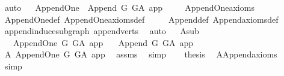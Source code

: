 \begin{isabellebody}
\ auto\isanewline
{}\isamarkupfalse%
%
\endisatagproof
{\isafoldproof}%
%
\isadelimproof
\ \isanewline
%
\endisadelimproof
\isanewline
\isanewline
{}\isamarkupfalse%
\ Append{\isacharunderscore}{\kern0pt}One\ {\isasymsubseteq}\ Append\ G\ G{\isacharunderscore}{\kern0pt}A\ {\isachardoublequoteopen}{\isacharbraceleft}{\kern0pt}app{\isacharbraceright}{\kern0pt}{\isachardoublequoteclose}\ \isanewline
%
\isadelimproof
\ \ %
\endisadelimproof
%
\isatagproof
{}\isamarkupfalse%
\ Append{\isacharunderscore}{\kern0pt}One{\isacharunderscore}{\kern0pt}axioms\ \ \isanewline
\ \ \isamarkupfalse%
\ Append{\isacharunderscore}{\kern0pt}One{\isacharunderscore}{\kern0pt}def\ Append{\isacharunderscore}{\kern0pt}One{\isacharunderscore}{\kern0pt}axioms{\isacharunderscore}{\kern0pt}def\ \isanewline
\ \ \ \ Append{\isacharunderscore}{\kern0pt}def\ Append{\isacharunderscore}{\kern0pt}axioms{\isacharunderscore}{\kern0pt}def\isanewline
\ \ \isamarkupfalse%
\ append{\isacharunderscore}{\kern0pt}induce{\isacharunderscore}{\kern0pt}subgraph\ append{\isacharunderscore}{\kern0pt}verts\ \isamarkupfalse%
\ auto%
\endisatagproof
{\isafoldproof}%
%
\isadelimproof
\ \isanewline
%
\endisadelimproof
\isanewline
{}\isamarkupfalse%
\ A{}{\isacharunderscore}{\kern0pt}sub{\isacharcolon}{\kern0pt}\isanewline
\ \ \ {\isachardoublequoteopen}Append{\isacharunderscore}{\kern0pt}One\ G\ G{\isacharunderscore}{\kern0pt}A\ app{\isachardoublequoteclose}\isanewline
\ \ \ {\isachardoublequoteopen}Append\ G\ G{\isacharunderscore}{\kern0pt}A\ {\isacharbraceleft}{\kern0pt}app{\isacharbraceright}{\kern0pt}{\isachardoublequoteclose}\isanewline
%
\isadelimproof
%
\endisadelimproof
%
\isatagproof
{}\isamarkupfalse%
\ {\isacharminus}{\kern0pt}\isanewline
\ \ \isamarkupfalse%
\ A{}{\isacharcolon}{\kern0pt}\ Append{\isacharunderscore}{\kern0pt}One\ G\ G{\isacharunderscore}{\kern0pt}A\ app\ \isamarkupfalse%
\ assms\ \isamarkupfalse%
\ simp\isanewline
\ \ \isamarkupfalse%
\ {\isacharquery}{\kern0pt}thesis\ \isamarkupfalse%
\ A{}{\isachardot}{\kern0pt}Append{\isacharunderscore}{\kern0pt}axioms\ \isamarkupfalse%
\ simp\isanewline
{}\isamarkupfalse%
%
\endisatagproof
{\isafoldproof}%
%
\isadelimproof
%
\endisadelimproof
%
\isadelimdocument
%
\endisadelimdocument
%
\isatagdocument
%
\end{isabellebody}
